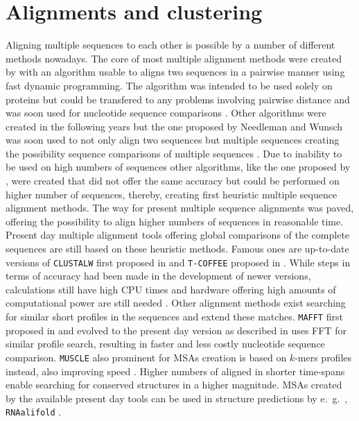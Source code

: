 \section{Alignments and clustering}

Aligning multiple sequences to each other is possible by a number of different methods nowadays. The core of most multiple alignment methods were created by \textcite{needleman_general_1970} with an algorithm usable to aligns two sequences in a pairwise manner using fast dynamic programming. The algorithm was intended to be used solely on proteins but could be transfered to any problems involving pairwise distance and was soon used for nucleotide sequence comparisons \autocite{phillips_multiple_2000}. Other algorithms were created in the following years but the one proposed by Needleman and Wunsch was soon used to not only align two sequences but multiple sequences creating the possibility sequence comparisons of multiple sequences \autocite{phillips_multiple_2000}. Due to inability to be used on high numbers of sequences other algorithms, like the one proposed by \textcite{feng_progressive_1987}, were created that did not offer the same accuracy but could be performed on higher number of sequences, thereby, creating first heuristic multiple sequence alignment methods. The way for present multiple sequence alignments was paved, offering the possibility to align higher numbers of sequences in reasonable time. Present day multiple alignment tools offering global comparisons of the complete sequences are still based on these heuristic methods. Famous ones are up-to-date versions of \texttt{CLUSTALW} first proposed in \textcite{thompson_clustal_1994} and \texttt{T-COFFEE} proposed in \textcite{notredame_t-coffee_2000}. While steps in terms of accuracy had been made in the development of newer versions, calculations still have high CPU times and hardware offering high amounts of computational power are still needed \autocite{katoh_mafft_2002}. Other alignment methods exist searching for similar short profiles in the sequences and extend these matches. \texttt{MAFFT} first proposed in \textcite{katoh_mafft_2002} and evolved to the present day version as described in \textcite{katoh_mafft_2013} uses \gls{FFT} for similar profile search, resulting in faster and less costly nucleotide sequence comparison. \texttt{MUSCLE} also prominent for \glspl{MSA} creation is based on $k$-mers profiles instead, also improving speed \autocite{edgar_muscle_2004}. Higher numbers of aligned in shorter time-spans enable searching for conserved structures in a higher magnitude. \glspl{MSA} created by the available present day tools can be used in structure predictions by e.~g.~, \texttt{RNAalifold} \autocite{bernhart_rnaalifold_2008}.

